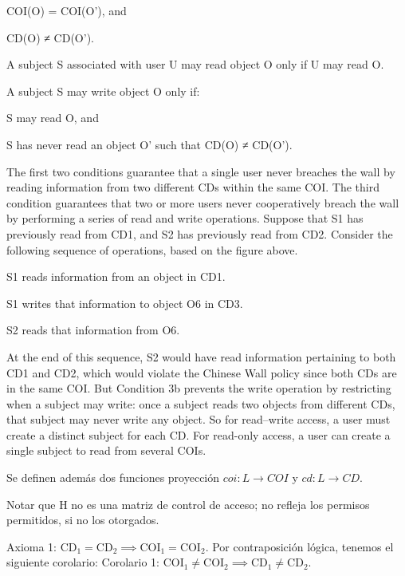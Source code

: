 \documentclass[spanish]{article}
\newcommand{\cd}{\text{CD}}
\newcommand{\coi}{\text{COI}}
\theoremstyle{definition}
\begin{document}
        COI(O) = COI(O'), and

        CD(O) ≠ CD(O').

    A subject S associated with user U may read object O only if U may read O.

    A subject S may write object O only if:

        S may read O, and

        S has never read an object O' such that CD(O) ≠ CD(O').

The first two conditions guarantee that a single user never breaches the wall by reading information from two different CDs within the same COI.  The third condition guarantees that two or more users never cooperatively breach the wall by performing a series of read and write operations.  Suppose that S1 has previously read from CD1, and S2 has previously read from CD2.  Consider the following sequence of operations, based on the figure above.

    S1 reads information from an object in CD1.

    S1 writes that information to object O6 in CD3.

    S2 reads that information from O6.

At the end of this sequence, S2 would have read information pertaining to both CD1 and CD2, which would violate the Chinese Wall policy since both CDs are in the same COI.  But Condition 3b prevents the write operation by restricting when a subject may write:  once a subject reads two objects from different CDs, that subject may never write any object.  So for read--write access, a user must create a distinct subject for each CD.  For read-only access, a user can create a single subject to read from several COIs.  


Se definen además dos funciones proyección $coi\colon L \to COI$ y $cd\colon L
\to CD$.

Notar que H no es una matriz de control de acceso; no refleja los
permisos permitidos, si no los otorgados.

Axioma 1: $\cd_1 = \cd_2 \implies \coi_1 = \coi_2$.
Por contraposición lógica, tenemos el siguiente corolario:
Corolario 1: $\coi_1 \neq \coi_2 \implies \cd_1 \neq \cd_2$.



\end{document}
